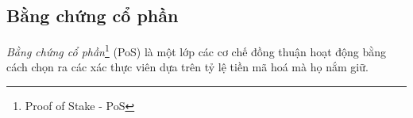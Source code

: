 \subsection{Bằng chứng cổ phần}

\textit{Bằng chứng cổ phần}\footnote{Proof of Stake - PoS} (PoS) là một lớp các cơ chế đồng thuận hoạt động bằng cách chọn ra các xác thực viên dựa trên tỷ lệ tiền mã hoá mà họ nắm giữ. 